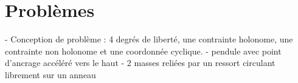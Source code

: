 \documentclass[english,french,14pt]{minimal}
\begin{document}
\section*{Problèmes}
- Conception de problème : 4 degrés de liberté, une contrainte holonome, une contrainte non holonome et une coordonnée cyclique.
- pendule avec point d'ancrage accéléré vers le haut
- 2 masses reliées par un ressort circulant librement sur un anneau 
\end{document}
